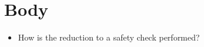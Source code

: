 \section{Body}




\begin{itemize}
  \item How is the reduction to a safety check performed?
\end{itemize}
